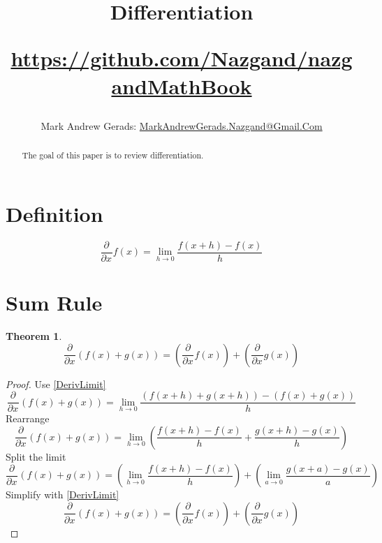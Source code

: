 \documentclass[]{article}
\author{Mark Andrew Gerads: \href{MailTo:MarkAndrewGerads.Nazgand@Gmail.Com}{MarkAndrewGerads.Nazgand@Gmail.Com}}
\title{
	Differentiation
	
	\href{https://github.com/Nazgand/nazgandMathBook}{https://github.com/Nazgand/nazgandMathBook}
}
\newcommand{\pqty}[1]{{\left(#1\right)}}
\newcommand{\pdiff}[2]{\frac{\partial^{#2}}{\partial #1^{#2}}}
\newtheorem{theorem}{Theorem}[section]
\numberwithin{equation}{section}
\begin{document}
	
	\maketitle
	
	\begin{abstract}
		The goal of this paper is to review differentiation.
	\end{abstract}
	
	\section{Definition}
	\begin{equation}
	\label{DerivLimit}
	\pdiff{x}{}f\pqty{x}=\lim\limits_{h\to 0}\frac{f\pqty{x+h}-f\pqty{x}}{h}
	\end{equation}
	
	\section{Sum Rule}
	\begin{theorem}
		\begin{equation}
		\label{DiffSum}
		\pdiff{x}{}\pqty{f\pqty{x}+g\pqty{x}}=
		\pqty{\pdiff{x}{}f\pqty{x}}+
		\pqty{\pdiff{x}{}g\pqty{x}}
		\end{equation}
	\end{theorem}
	\begin{proof}
		Use \eqref{DerivLimit}
		\begin{equation}
		\pdiff{x}{}\pqty{f\pqty{x}+g\pqty{x}}
		=\lim\limits_{h\to 0}
		\frac{\pqty{f\pqty{x+h}+g\pqty{x+h}}-\pqty{f\pqty{x}+g\pqty{x}}}{h}
		\end{equation}
		Rearrange
		\begin{equation}
		\pdiff{x}{}\pqty{f\pqty{x}+g\pqty{x}}
		=\lim\limits_{h\to 0}
		\pqty{\frac{{f\pqty{x+h}-f\pqty{x}}}{h}
		+
		\frac{{g\pqty{x+h}-g\pqty{x}}}{h}}
		\end{equation}
		Split the limit
		\begin{equation}
		\pdiff{x}{}\pqty{f\pqty{x}+g\pqty{x}}
		=\pqty{\lim\limits_{h\to 0}
		\frac{{f\pqty{x+h}-f\pqty{x}}}{h}}
			+ \pqty{\lim\limits_{a\to 0}
			\frac{{g\pqty{x+a}-g\pqty{x}}}{a}}
		\end{equation}
		Simplify with \eqref{DerivLimit}
		\begin{equation}
		\pdiff{x}{}\pqty{f\pqty{x}+g\pqty{x}}=
		\pqty{\pdiff{x}{}f\pqty{x}}+
		\pqty{\pdiff{x}{}g\pqty{x}}
		\end{equation}
	\end{proof}
\end{document}
